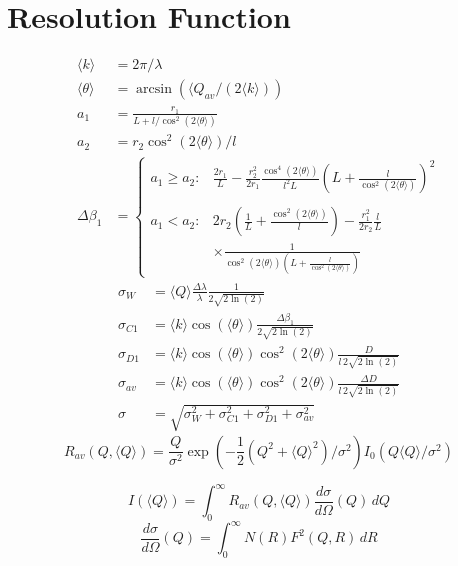 \clearpage
\section{Resolution Function \cite{Pedersen1990}}
\begin{align}
    \langle k\rangle      & = 2 \pi/\lambda \\
    \langle \theta\rangle  &= \arcsin(\langle Q_{av}/(2 \langle k\rangle )) \\
    a_1        &= \frac{r_1}{L+l/\cos^2(2\langle \theta\rangle )} \\
    a_2        &= r_2 \cos^2(2 \langle \theta\rangle )/l \\
    \Delta\beta_1 &=
       \begin{cases}
          a_1 \geq a_2: & \displaystyle \frac{2 r_1}{L} - \frac{r_2^2}{2 r_1}
          \frac{\cos^4(2\langle \theta\rangle )}{l^2L}
                          \left(L+\frac{l}{\cos^2(2\langle \theta\rangle )}\right)^2\\
                          ~
                          \\
          a_1 < a_2: & \displaystyle 2 r_2\left(\frac{1}{L} + \frac{\cos^2(2\langle \theta\rangle )}{l}\right)
                 - \frac{r_1^2}{2r_2}  \frac{l}{L} \\
                 & \displaystyle \times
                 \frac{1}{\cos^2(2\langle \theta\rangle ) \left(L+\frac{l}{\cos^2(2\langle \theta\rangle )}\right)}
       \end{cases}
\end{align}
\begin{align}
    \sigma_W  &= \langle Q\rangle \frac{\Delta\lambda}{\lambda}\frac{1}{2\sqrt{2\ln(2)}} \\
    \sigma_{C1} &= \langle k\rangle\cos(\langle \theta\rangle)\frac{\Delta\beta_1}{2\sqrt{2\ln(2)}}  \\
    \sigma_{D1} &= \langle k\rangle\cos(\langle \theta\rangle)\cos^2(2\langle \theta\rangle) \frac{D}{l \,2\sqrt{2\ln(2)}} \\
    \sigma_{av} &= \langle k\rangle\cos(\langle \theta\rangle)\cos^2(2\langle \theta\rangle) \frac{\Delta D}{l \,2\sqrt{2\ln(2)}} \\
    \sigma &= \sqrt{\sigma^2_W+\sigma^2_{C1}+\sigma^2_{D1}+\sigma^2_{av}}
\end{align}
\begin{equation}
R_{av}\left(Q,\langle Q\rangle\right) = \frac{Q}{\sigma^2}
 \exp\left( -\frac{1}{2}\left(Q^2+\langle Q\rangle^2\right)/\sigma^2\right)
 I_0(Q\langle Q\rangle/\sigma^2)
\end{equation}

\begin{equation}
I(\langle Q\rangle) = \int_0^\infty R_{av}\left(Q,\langle
Q\rangle\right) \frac{d\sigma}{d\Omega}(Q) \, dQ
\end{equation}
\begin{equation}
\frac{d\sigma}{d\Omega}(Q) = \int_0^\infty N(R) F^2(Q,R) \, dR
\end{equation}
